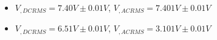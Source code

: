 \begin{itemize}
     \item $V_{, DCRMS}=7.40V\pm 0.01\unit{V}$, $V_{, ACRMS}=7.401V\pm 0.01\unit{V}$ 
     \item $V_{, DCRMS}=6.51V\pm 0.01\unit{V}$, $V_{, ACRMS}=3.101V\pm 0.01\unit{V}$\\
\end{itemize}